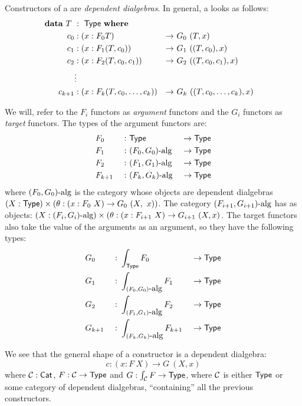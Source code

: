 \documentclass[a4paper,10pt]{report}
\begin{document}
Constructors of a \hit are \emph{dependent dialgebras}. In general, a
\hit looks as follows:
%
\begin{alignat*}{5}
  &\rlap{$\data\ T\ :\ \Type\ \where$}& \\
  &&\ \ c_0    &: (x : F_0 T)                    &\to\ &G_0\ (T, x)& \\
  &&\ \ c_1    &: (x : F_1 (T,c_0))              &\to\ &G_1\ ((T, c_0), x)& \\
  &&\ \ c_2    &: (x : F_2 (T,c_0,c_1))          &\to\ &G_2\ ((T, c_0, c_1), x)& \\
  &&\ \        &\vdots &&&\\
  &&\ \ c_{k+1} & : (x : F_k (T,c_0, \hdots, c_k)) &\to\ &G_k\ ((T, c_0, \hdots, c_k), x)&
\end{alignat*}

We will, refer to the $F_i$ functors as \emph{argument} functors and the
$G_i$ functors as \emph{target} functors. The types of the argument
functors are:
%
\begin{alignat*}{6}
&F_0     &\ :\ &\mathsf{Type}                &\ \to \mathsf{Type}& \\
&F_1     &\ :\ &(F_0, G_0)\mbox{-alg}  &\ \to \mathsf{Type}& \\      
&F_2     &\ :\ &(F_1, G_1)\mbox{-alg}  &\ \to \mathsf{Type}& \\      
&F_{k+1} &\ :\ &(F_k, G_k)\mbox{-alg}  &\ \to \mathsf{Type}&
\end{alignat*}
%
where $(F_0, G_0)\mbox{-alg}$ is the category whose objects are dependent
dialgebras $(X : \mathsf{Type}) \times (\theta : (x : F_0\ X) \to G_0\ (X,\ x))$. The category
$(F_{i+1},G_{i+1})\mbox{-alg}$ has as objects: $(X : (F_i,G_i)\mbox{-alg}) \times (\theta : (x :
F_{i+1}\ X) \to G_{i+1}\ (X, x)$. The target functors also take the value of
the arguments as an argument, so they have the following types:
%
\begin{alignat*}{6}
&G_0     &\ :\ &\int_{\Type} F_0                &\ \to \Type& \\
&G_1     &\ :\ &\int_{\algcat{(F_0, G_0)}} F_1  &\ \to \Type& \\      
&G_2     &\ :\ &\int_{\algcat{(F_1, G_1)}} F_2  &\ \to \Type& \\      
&G_{k+1} &\ :\ &\int_{\algcat{(F_k, G_k)}} F_{k+1}  &\ \to \Type&
\end{alignat*}

We see that the general shape of a constructor is a dependent dialgebra:
$$
c : (x : F\ X) \to G\ (X , x)
$$
where $\mathcal{C} : \mathsf{Cat}$, $F : \mathcal{C} \to \mathsf{Type}$ and
$G : \int_{\mathcal{C}} F \to \mathsf{Type}$, where $\mathcal{C}$ is either $\mathsf{Type}$ or some
category of dependent dialgebras, ``containing'' all the previous
constructors.
\end{document}
